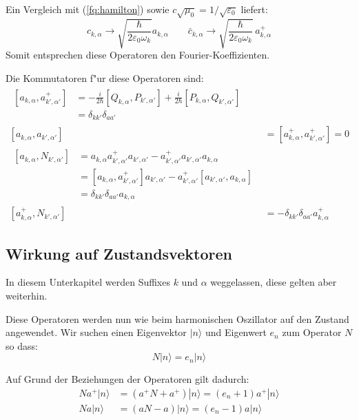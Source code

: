 Ein Vergleich mit (\ref{fq:hamilton}) sowie $c\sqrt{\mu_0}=1/\sqrt{\varepsilon_0}$ liefert:
\begin{equation} \label{fq:opp_fourier}
 c_{k,\alpha} \rightarrow \sqrt{\frac{\hbar}{2 \varepsilon_0 \omega_k}} a_{k,\alpha} \qquad 
 \bar{c}_{k,\alpha} \rightarrow \sqrt{\frac{\hbar}{2 \varepsilon_0 \omega_k}} \, a^+_{k,\alpha}
\end{equation}
Somit entsprechen diese Operatoren den Fourier-Koeffizienten.

Die Kommutatoren f"ur diese Operatoren sind:
\begin{align*}
\begin{split}
[a_{k,\alpha} , a^+_{k',\alpha'}] &= - \frac{i}{2 \hbar} [Q_{k,\alpha}, P_{k',\alpha'}] + \frac{i}{2 \hbar} [P_{k,\alpha}, Q_{k',\alpha'}] \\
	 &= \delta_{kk'}\delta_{aa'}
\end{split}\\
[a_{k,\alpha} , a_{k',\alpha'}] &= [a^+_{k,\alpha} , a^+_{k',\alpha'}] = 0 \\
\begin{split}
[a_{k,\alpha} , N_{k',\alpha'}] &= a_{k,\alpha} a^+_{k',\alpha'} a_{k',\alpha'} - a^+_{k',\alpha'} a_{k',\alpha'} a_{k,\alpha} \\
	&= [a_{k,\alpha} , a^+_{k',\alpha'}]a_{k',\alpha'} - a^+_{k',\alpha'}[a_{k',\alpha'} , a_{k,\alpha}]\\
	&= \delta_{kk'}\delta_{aa'} a_{k,\alpha}
\end{split} \\
[a^+_{k,\alpha} , N_{k',\alpha'}] &= -\delta_{kk'}\delta_{aa'} a^+_{k,\alpha}
\end{align*}

\subsection{Wirkung auf Zustandsvektoren}

In diesem Unterkapitel werden Suffixes $k$ und $\alpha$ weggelassen, diese gelten aber weiterhin. 

Diese Operatoren werden nun wie beim harmonischen Oszillator auf den Zustand angewendet. Wir suchen einen Eigenvektor $|n\rangle$ und Eigenwert $e_n$ zum Operator $N$ so dass:
\begin{equation*}
N|n\rangle = e_n|n\rangle
\end{equation*}

Auf Grund der Beziehungen der Operatoren gilt dadurch:
\begin{align*}
Na^+|n\rangle &= (a^+N + a^+)|n\rangle = (e_n + 1)a^+|n\rangle \\
Na|n\rangle &= (aN - a)|n\rangle = (e_n - 1)a|n\rangle
\end{align*}

